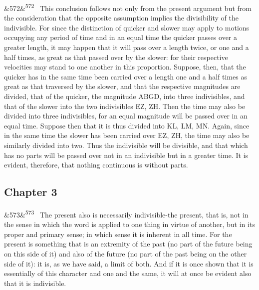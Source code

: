 \documentclass[12pt]{article}
\newcommand{\para}[1][]{\par\noindent\ifx&#1&\else\textsuperscript{\footnotesize #1}~\fi}
\begin{document}
\para[572] This conclusion follows not only from the present argument but from the consideration that the opposite assumption implies the divisibility of the indivisible. For since the distinction of quicker and slower may apply to motions occupying any period of time and in an equal time the quicker passes over a greater length, it may happen that it will pass over a length twice, or one and a half times, as great as that passed over by the slower: for their respective velocities may stand to one another in this proportion. Suppose, then, that the quicker has in the same time been carried over a length one and a half times as great as that traversed by the slower, and that the respective magnitudes are divided, that of the quicker, the magnitude ABGD, into three indivisibles, and that of the slower into the two indivisibles EZ, ZH. Then the time may also be divided into three indivisibles, for an equal magnitude will be passed over in an equal time. Suppose then that it is thus divided into KL, LM, MN. Again, since in the same time the slower has been carried over EZ, ZH, the time may also be similarly divided into two. Thus the indivisible will be divisible, and that which has no parts will be passed over not in an indivisible but in a greater time. It is evident, therefore, that nothing continuous is without parts.

\subsection*{Chapter 3}

\para[573] The present also is necessarily indivisible-the present, that is, not in the sense in which the word is applied to one thing in virtue of another, but in its proper and primary sense; in which sense it is inherent in all time. For the present is something that is an extremity of the past (no part of the future being on this side of it) and also of the future (no part of the past being on the other side of it): it is, as we have said, a limit of both. And if it is once shown that it is essentially of this character and one and the same, it will at once be evident also that it is indivisible.
\end{document}

